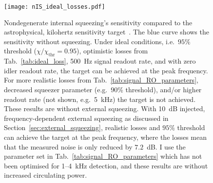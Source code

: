 \begin{figure}
    \centering
    \texttt{[image: nIS\_ideal\_losses.pdf]}
    \caption{  Nondegenerate internal squeezing's sensitivity compared to the astrophysical, kilohertz sensitivity target~\cite{miaoDesignGravitationalWaveDetectors2018}. The blue curve shows the sensitivity without squeezing. Under ideal conditions, i.e.\ $95\%$ threshold ($\chi/\chi_\text{thr}=0.95$), optimistic losses from Tab.~\ref{tab:ideal_loss}, 500~Hz signal readout rate, and with zero idler readout rate, the target can be achieved at the peak frequency. For more realistic losses from Tab.~\ref{tab:signal_RO_parameters}, decreased squeezer parameter (e.g.\ $90\%$ threshold), and/or higher readout rate (not shown, e.g.\ 5~kHz) the target is not achieved. These results are without external squeezing. With 10~dB injected, frequency-dependent external squeezing as discussed in Section~\ref{sec:external_squeezing}, realistic losses and $95\%$ threshold can achieve the target at the peak frequency, where the losses mean that the measured noise is only reduced by $7.2$~dB.
    I use the parameter set in Tab.~\ref{tab:signal_RO_parameters} which has not been optimised for 1--4~kHz detection, and these results are without increased circulating power.}
    \label{fig:nIS_sens_target}
\end{figure}

